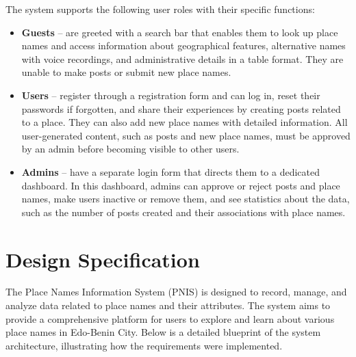 The system supports the following user roles with their specific functions:
\begin{itemize}
    \item \textbf{Guests} -- are greeted with a search bar that enables them to look up place names and access information about geographical features, alternative names with voice recordings, and administrative details in a table format. They are unable to make posts or submit new place names.
\item \textbf{Users} -- register through a registration form and can log in, reset their passwords if forgotten, and share their experiences by creating posts related to a place. They can also add new place names with detailed information. All user-generated content, such as posts and new place names, must be approved by an admin before becoming visible to other users.
\item \textbf{Admins} -- have a separate login form that directs them to a dedicated dashboard. In this dashboard, admins can approve or reject posts and place names, make users inactive or remove them, and see statistics about the data, such as the number of posts created and their associations with place names.
\end{itemize}

\section{Design Specification}
The Place Names Information System (PNIS) is designed to record, manage, and analyze data related to place names and their attributes. The system aims to provide a comprehensive platform for users to explore and learn about various place names in Edo-Benin City. Below is a detailed blueprint of the system architecture, illustrating how the requirements were implemented.

